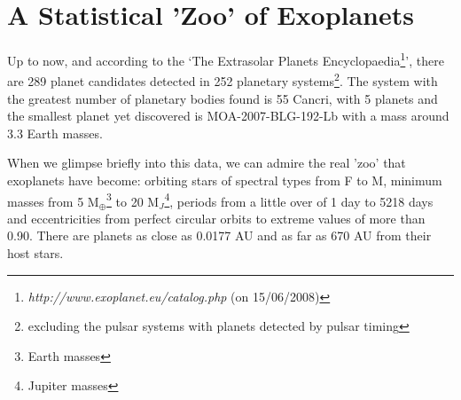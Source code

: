 \documentclass[dvips,12pt,a4paper]{report}
\begin{document}



\section {A Statistical 'Zoo' of Exoplanets}

Up to now, and according to the `The Extrasolar Planets Encyclopaedia\footnote{\textit{http://www.exoplanet.eu/catalog.php} (on 15/06/2008)}', there are 289 planet candidates detected in 252 planetary systems\footnote{excluding the pulsar systems with planets detected by pulsar timing}. The system with the greatest number of planetary bodies found is 55 Cancri, with 5 planets \citep{Fischer-2008} and the smallest planet yet discovered is MOA-2007-BLG-192-Lb \citep{Bennett-2008} with a mass around 3.3 Earth masses.

When we glimpse briefly into this data, we can admire the real 'zoo' that exoplanets have become: orbiting stars of spectral types from F to M, minimum masses from 5 M$_{\oplus}$\footnote{Earth masses} to 20 M$_J$\footnote{Jupiter masses}, periods from a little over of 1 day to 5218 days and eccentricities from perfect circular orbits to extreme values of more than 0.90. There are planets as close as 0.0177 AU and as far as 670 AU from their host stars.
\end{document}
